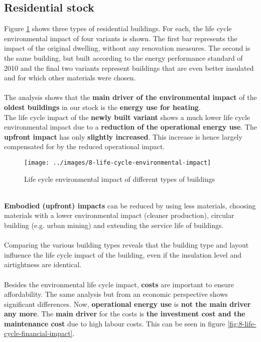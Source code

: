 \documentclass[../summary.tex]{subfiles}
\begin{document}
	
	\subsection{Residential stock}
	
	Figure \ref{fig:8-life-cycle-environmental-impact} shows three types of residential buildings. For each, the life cycle environmental impact of four variants is shown. The first bar represents the impact of the original dwelling, without any renovation measures. The second is the same building, but built according to the energy performance standard of 2010 and the final two variants represent buildings that are even better insulated and for which other materials were chosen.
	\\\\
	The analysis shows that the \textbf{main driver of the environmental impact} of the \textbf{oldest buildings} in our stock is the \textbf{energy use for heating}.
	\\
	The life cycle impact of the \textbf{newly built variant} shows a much lower life cycle environmental impact due to a \textbf{reduction of the operational energy use}. The \textbf{upfront impact} has only \textbf{slightly increased}. This increase is hence largely compensated for by the reduced operational impact.
	
	\begin{figure}[H]
		\centering
		\texttt{[image: ../images/8-life-cycle-environmental-impact]}
		\caption{Life cycle environmental impact of different types of buildings}
		\label{fig:8-life-cycle-environmental-impact}
	\end{figure}
	\ \\
	\textbf{Embodied (upfront) impacts} can be reduced by using less materials, choosing materials with a lower environmental impact (cleaner production), circular building (e.g. urban mining) and extending the service life of buildings.
	\\\\
	Comparing the various building types reveals that the building type and layout influence the life cycle impact of the building, even if the insulation level and airtightness are identical.
	\\\\
	Besides the environmental life cycle impact, \textbf{costs} are important to ensure affordability. The same analysis but from an economic perspective shows significant differences. Now, \textbf{operational energy use} is \textbf{not the main driver any more}.
	The \textbf{main driver} for the costs is \textbf{the investment cost and the maintenance cost} due to high labour costs. This can be seen in figure \ref{fig:8-life-cycle-financial-impact}.
	
\end{document}
